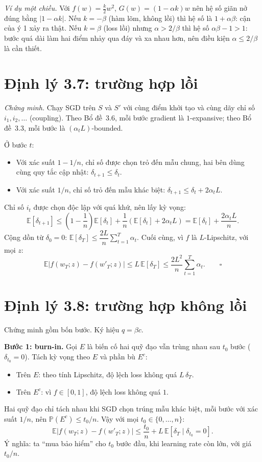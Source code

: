\textit{Ví dụ một chiều.} Với $f(w) = \frac{k}{2}w^2$, $G(w) = (1 - \alpha k)w$ nên hệ số giãn nở đúng bằng $|1 - \alpha k|$. Nếu $k = -\beta$ (hàm lõm, không lồi) thì hệ số là $1 + \alpha\beta$: cận của ý 1 xảy ra thật. Nếu $k = \beta$ (loss lồi) nhưng $\alpha > 2/\beta$ thì hệ số $\alpha\beta - 1 > 1$: bước quá dài làm hai điểm nhảy qua đáy và xa nhau hơn, nên điều kiện $\alpha \le 2/\beta$ là cần thiết.

\section{Định lý 3.7: trường hợp lồi}

\textit{Chứng minh.} Chạy SGD trên $S$ và $S'$ với cùng điểm khởi tạo và cùng dãy chỉ số $i_1, i_2, \ldots$ (coupling). Theo Bổ đề~3.6, mỗi bước gradient là $1$-expansive; theo Bổ đề~3.3, mỗi bước là $(\alpha_t L)$-bounded.

Ở bước $t$:
\begin{itemize}
    \item Với xác suất $1 - 1/n$, chỉ số được chọn trỏ đến mẫu chung, hai bên dùng cùng quy tắc cập nhật: $\delta_{t+1} \le \delta_t$.
    \item Với xác suất $1/n$, chỉ số trỏ đến mẫu khác biệt: $\delta_{t+1} \le \delta_t + 2\alpha_t L$.
\end{itemize}
Chỉ số $i_t$ được chọn độc lập với quá khứ, nên lấy kỳ vọng:
\[
\mathbb{E}[\delta_{t+1}] \le \left(1 - \frac{1}{n}\right)\mathbb{E}[\delta_t] + \frac{1}{n}\left(\mathbb{E}[\delta_t] + 2\alpha_t L\right) = \mathbb{E}[\delta_t] + \frac{2\alpha_t L}{n}.
\]
Cộng dồn từ $\delta_0 = 0$: $\mathbb{E}[\delta_T] \le \dfrac{2L}{n}\sum_{t=1}^{T}\alpha_t$. Cuối cùng, vì $f$ là $L$-Lipschitz, với mọi $z$:
\[
\mathbb{E}\left|f(w_T; z) - f(w'_T; z)\right| \le L\,\mathbb{E}[\delta_T] \le \frac{2L^2}{n}\sum_{t=1}^{T}\alpha_t. \qquad \square
\]

\section{Định lý 3.8: trường hợp không lồi}

Chứng minh gồm bốn bước. Ký hiệu $q = \beta c$.

\textbf{Bước 1: burn-in.} Gọi $E$ là biến cố hai quỹ đạo vẫn trùng nhau sau $t_0$ bước ($\delta_{t_0} = 0$). Tách kỳ vọng theo $E$ và phần bù $E^c$:
\begin{itemize}
    \item Trên $E$: theo tính Lipschitz, độ lệch loss không quá $L\,\delta_T$.
    \item Trên $E^c$: vì $f \in [0, 1]$, độ lệch loss không quá $1$.
\end{itemize}
Hai quỹ đạo chỉ tách nhau khi SGD chọn trúng mẫu khác biệt, mỗi bước với xác suất $1/n$, nên $\mathbb{P}(E^c) \le t_0/n$. Vậy với mọi $t_0 \in \{0, \ldots, n\}$:
\[
\mathbb{E}\left|f(w_T; z) - f(w'_T; z)\right| \le \frac{t_0}{n} + L\,\mathbb{E}\left[\delta_T \mid \delta_{t_0} = 0\right].
\]
Ý nghĩa: ta ``mua bảo hiểm'' cho $t_0$ bước đầu, khi learning rate còn lớn, với giá $t_0/n$.

